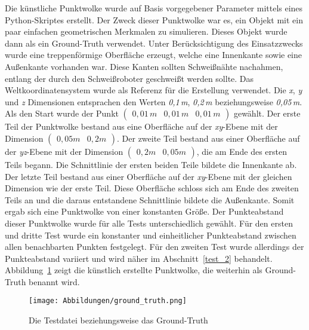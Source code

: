 Die künstliche Punktwolke wurde auf Basis vorgegebener Parameter mittels eines Python-Skriptes erstellt. Der Zweck dieser Punktwolke war es, ein Objekt mit ein paar einfachen geometrischen Merkmalen zu simulieren. Dieses Objekt wurde dann als ein Ground-Truth verwendet. Unter Berücksichtigung des Einsatzzwecks wurde eine treppenförmige Oberfläche erzeugt, welche eine Innenkante sowie eine Außenkante vorhanden war. Diese Kanten sollten Schweißnähte nachahmen, entlang der durch den Schweißroboter geschweißt werden sollte. Das Weltkoordinatensystem wurde als Referenz für die Erstellung verwendet. Die \textit{x}, \textit{y} und \textit{z} Dimensionen entsprachen den Werten \textit{0,1\,m}, \textit{0,2\,m} beziehungsweise \textit{0,05\,m}. Als den Start wurde der Punkt $\left(\begin{smallmatrix}
	0,01\,m & 0,01\,m & 0,01\,m
\end{smallmatrix}\right)$ gewählt. Der erste Teil der Punktwolke bestand aus eine Oberfläche auf der \textit{xy}-Ebene mit der Dimension $\left(\begin{smallmatrix}
0,05m & 0,2m
\end{smallmatrix}\right)$. Der zweite Teil bestand aus einer Oberfläche auf der \textit{yz}-Ebene mit der Dimension $\left(\begin{smallmatrix}
0,2m & 0,05m
\end{smallmatrix}\right)$, die am Ende des ersten Teils begann. Die Schnittlinie der ersten beiden Teile bildete die Innenkante ab. Der letzte Teil bestand aus einer Oberfläche auf der \textit{xy}-Ebene mit der gleichen Dimension wie der erste Teil. Diese Oberfläche schloss sich am Ende des zweiten Teils an und die daraus entstandene Schnittlinie bildete die Außenkante. Somit ergab sich eine Punktwolke von einer konstanten Größe. Der Punkteabstand dieser Punktwolke wurde für alle Tests unterschiedlich gewählt. Für den ersten und dritte Test wurde ein konstanter und einheitlicher Punkteabstand zwischen allen benachbarten Punkten festgelegt. Für den zweiten Test wurde allerdings der Punkteabstand variiert und wird näher im Abschnitt~\ref{test_2} behandelt. Abbildung~\ref{fig: ground_truth} zeigt die künstlich erstellte Punktwolke, die weiterhin als Ground-Truth benannt wird. 

\begin{figure}[t]
	\texttt{[image: Abbildungen/ground\_truth.png]}
	\centering
	\caption[Ground-Truth Datei]{Die Testdatei beziehungsweise das Ground-Truth}
	\label{fig: ground_truth}
\end{figure}

